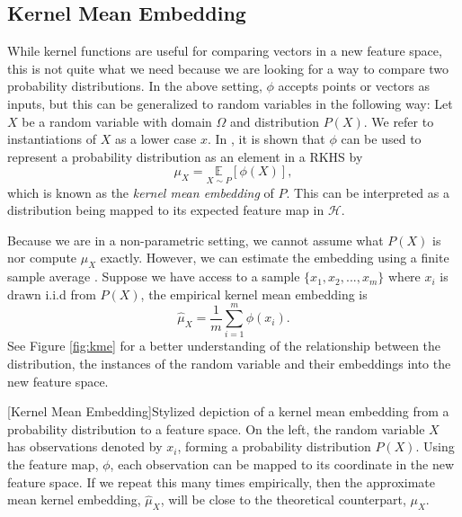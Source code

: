 \subsection{Kernel Mean Embedding}
\label{kernel_mean_emb}
While kernel functions are useful for comparing vectors in a new feature space, this is not quite what we need because we are looking for a way to compare two probability distributions. In the above setting, $\phi$ accepts points or vectors as inputs, but this can be generalized to random variables in the following way: Let $X$ be a random variable with domain $\Omega$ and distribution $P(X)$. We refer to instantiations of $X$ as a lower case $x$. In \cite{smola2007hilbert}, it is shown that $\phi$ can be used to represent a probability distribution as an element in a RKHS by
\begin{equation}
\mu_X =\underset{X \sim P} {\mathbb{E}}[\phi(X)],
\end{equation}
which is known as the \textit{kernel mean embedding} of $P$. This can be interpreted as a  distribution being mapped to its expected feature map in $\mathcal{H}$. 

Because we are in a non-parametric setting, we cannot assume what $P(X)$ is nor compute $\mu_X$ exactly. However, we can estimate the embedding using a finite sample average  \cite{smola2007hilbert}. Suppose we have access to a sample $\{x_1, x_2, ..., x_m\}$ where $x_i$ is drawn i.i.d from $P(X)$, the empirical kernel mean embedding is 
\begin{equation}
\hat{\mu}_X = \frac{1}{m} \sum_{i=1}^m \phi(x_i).
\end{equation}
See Figure \ref{fig:kme} for a better understanding of the relationship between the distribution, the instances of the random variable and their embeddings into the new feature space.
\begin{minipage}{\textwidth}
\begin{center} 
[Kernel Mean Embedding]{Stylized depiction of a kernel mean embedding from a probability distribution to a feature space. On the left, the random variable $X$ has observations denoted by $x_i$, forming a probability distribution $P(X)$.  Using the feature map, $\phi$, each observation can be mapped to its coordinate in the new feature space.  If we repeat this many times empirically, then the approximate mean kernel embedding, $\hat{\mu}_X$, will be close to the theoretical counterpart, $\mu_X$.} 
\label{fig:kme} 
\end{center}
\end{minipage}

